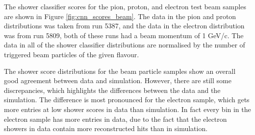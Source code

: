 The shower classifier scores for the pion, proton, and electron test beam 
samples are shown in Figure \ref{fig:cnn_scores_beam}. The data in the pion 
and proton distributions was taken from \protodune{} run 5387, and the data in 
the electron distribution was from run 5809, both of these runs had a beam 
momentum of 1 GeV/c. The data in all of the shower classifier distributions 
are normalised by the number of triggered beam particles of the given flavour.

The shower score distributions for the beam particle samples show an overall
good agreement between data and simulation. However, there are still some
discrepancies, which highlights the differences between the data and the
simulation. The difference is most pronounced for the electron sample, which
gets more entries at low shower scores in data than simulation. In fact every
bin in the electron sample has more entries in data, due to the fact that the
electron showers in data contain more reconstructed hits than in simulation. 
